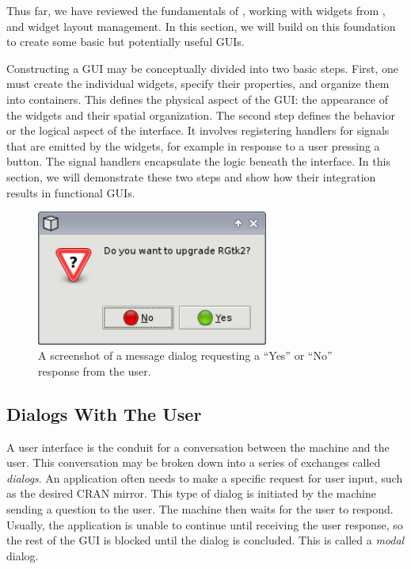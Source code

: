 \documentclass[article]{jss}
\begin{document}
Thus far, we have reviewed the fundamentals of , working with
 widgets from , and widget layout management. In this
section, we will build on this foundation to create some basic but potentially
useful GUIs. 

Constructing a GUI may be conceptually divided into two basic steps.
First, one must create the individual widgets, specify their properties,
and organize them into containers. This defines the physical aspect
of the GUI: the appearance of the widgets and their spatial organization.
The second step defines the behavior or the logical aspect of the
interface. It involves registering handlers for signals that are emitted
by the widgets, for example in response to a user pressing a button.
The signal handlers encapsulate the logic beneath the interface. In this
section, we will demonstrate these two steps and show how their integration
results in functional GUIs.

\begin{figure}
\begin{center}
\includegraphics[width=3in]{upgrade-dialog.png}
\caption{\label{fig:upgrade-dialog}A screenshot of a message dialog requesting a 
``Yes'' or ``No'' response from the user.}
\end{center}
\end{figure}

\subsection{Dialogs With The User}\label{sec:dialog-example}

A user interface is the conduit for a conversation between the machine and the
user. This conversation may be broken down into a series of exchanges called 
\emph{dialogs}. An application often needs to make a specific request
for user input, such as the desired CRAN mirror. This type of dialog is 
initiated by the machine sending a question to the user. The machine then
waits for the user to respond. Usually, the application is unable to continue
until receiving the user response, so the rest of the GUI is blocked until
the dialog is concluded. This is called a \emph{modal} dialog.
\end{document}
